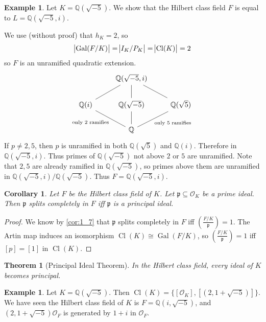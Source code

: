 \documentclass[11pt]{article}
\theoremstyle{definition}
\newtheorem{example}[definition]{Example}
\theoremstyle{plain}
\newtheorem{theorem}[definition]{Theorem}
\newtheorem{corollary}[definition]{Corollary}
\theoremstyle{remark}
\DeclareMathOperator{\Gal}{Gal}
\DeclareMathOperator{\Cl}{Cl}
\newcommand{\QQ}{\mathbb{Q}}
\newcommand{\cO}{\mathcal{O}}
\newcommand{\fp}{\mathfrak{p}}
\newcommand{\leg}[2]{\left(\frac{#1}{#2}\right)}
\begin{document}
\begin{example}\label{eg:4_7}
    Let $K = \QQ(\sqrt{-5})$. We show that the Hilbert class field $F$ is equal to $L = \QQ(\sqrt{-5}, i)$.

    We use (without proof) that $h_K = 2$, so
    \begin{equation*}
        \abs{\Gal(F/K)} = \abs{I_K/P_K} = \abs{\Cl(K)} = 2
    \end{equation*}
    so $F$ is an unramified quadratic extension.
    \begin{equation*}
    \begin{tikzcd}
        & \QQ(\sqrt{-5}, i) \arrow[dl, dash] \arrow[d, dash] \arrow[dr, dash] &\\
        \QQ(i) \arrow[dr, dash, "\text{only } 2 \text{ ramifies}"'] & \QQ(\sqrt{-5}) \arrow[d, dash] & \QQ(\sqrt{5}) \arrow[dl, dash, "\text{only } 5 \text{ ramifies}"]\\
        & \QQ
    \end{tikzcd}
    \end{equation*}
    If $p \neq 2, 5$, then $p$ is unramified in both $\QQ(\sqrt{5})$ and $\QQ(i)$. Therefore in $\QQ(\sqrt{-5}, i)$. Thus primes of $\QQ(\sqrt{-5})$ not above $2$ or $5$ are unramified. Note that $2, 5$ are already ramified in $\QQ(\sqrt{-5})$, so primes above them are unramified in $\QQ(\sqrt{-5}, i)/\QQ(\sqrt{-5})$. Thus $F = \QQ(\sqrt{-5}, i)$.
\end{example}

\begin{corollary}\label{cor:4_8}
    Let $F$ be the Hilbert class field of $K$. Let $\fp \subseteq \cO_K$ be a prime ideal. Then $\fp$ splits completely in $F$ iff $\fp$ is a principal ideal.
\end{corollary}
\begin{proof}
    We know by \autoref{cor:1_7} that $\fp$ splits completely in $F$ iff $\leg{F/K}{\fp} = 1$. The Artin map induces an isomorphism $\Cl(K) \cong \Gal(F/K)$, so $\leg{F/K}{\fp} = 1$ iff $[p] = [1]$ in $\Cl(K)$.
\end{proof}

\begin{theorem}[Principal Ideal Theorem]\label{thm:4_9}
    In the Hilbert class field, every ideal of $K$ becomes principal.
\end{theorem}

\begin{example}\label{eg:4_10}
    Let $K = \QQ(\sqrt{-5})$. Then $\Cl(K) = \{[\cO_K], [(2, 1+\sqrt{-5})]\}$. We have seen the Hilbert class field of $K$ is $F = \QQ(i, \sqrt{-5})$, and $(2, 1+\sqrt{-5}) \cO_F$ is generated by $1+i$ in $\cO_F$.
\end{example}
\end{document}
